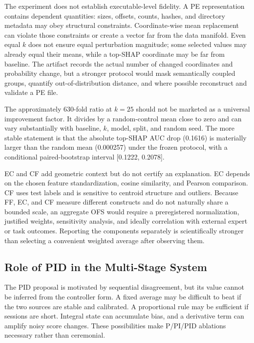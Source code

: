 The experiment does not establish executable-level fidelity. A PE representation
contains dependent quantities: sizes, offsets, counts, hashes, and directory
metadata may obey structural constraints. Coordinate-wise mean replacement can
violate those constraints or create a vector far from the data manifold. Even
equal $k$ does not ensure equal perturbation magnitude; some selected values may
already equal their means, while a top-SHAP coordinate may be far from baseline.
The artifact records the actual number of changed coordinates and probability
change, but a stronger protocol would mask semantically coupled groups, quantify
out-of-distribution distance, and where possible reconstruct and validate a PE
file.

The approximately 630-fold ratio at $k=25$ should not be marketed as a universal
improvement factor. It divides by a random-control mean close to zero and can vary
substantially with baseline, $k$, model, split, and random seed. The more stable
statement is that the absolute top-SHAP AUC drop (0.1616) is materially larger
than the random mean (0.000257) under the frozen protocol, with a conditional
paired-bootstrap interval [0.1222, 0.2078].

EC and CF add geometric context but do not certify an explanation. EC depends on
the chosen feature standardization, cosine similarity, and Pearson comparison.
CF uses test labels and is sensitive to centroid structure and outliers. Because
FF, EC, and CF measure different constructs and do not naturally share a bounded
scale, an aggregate OFS would require a preregistered normalization, justified
weights, sensitivity analysis, and ideally correlation with external expert or
task outcomes. Reporting the components separately is scientifically stronger
than selecting a convenient weighted average after observing them.

\subsection{Role of PID in the Multi-Stage System}

The PID proposal is motivated by sequential disagreement, but its value cannot be
inferred from the controller form. A fixed average may be difficult to beat if
the two sources are stable and calibrated. A proportional rule may be sufficient
if sessions are short. Integral state can accumulate bias, and a derivative term
can amplify noisy score changes. These possibilities make P/PI/PID ablations
necessary rather than ceremonial.


